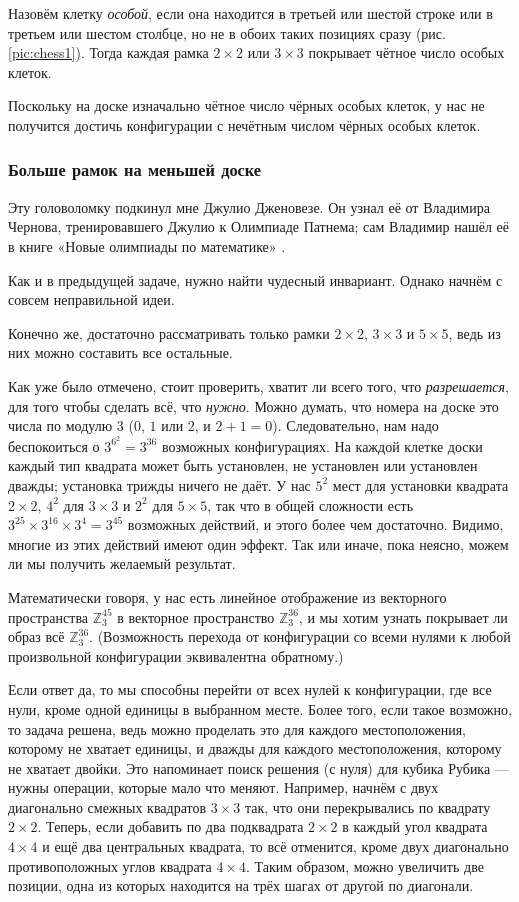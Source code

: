 Назовём клетку \emph{особой}, если она находится в третьей или шестой строке или в третьем или шестом столбце, но не в обоих таких позициях сразу (рис. \ref{pic:chess1}).
Тогда каждая рамка $2 \times 2$ или $3 \times 3$ покрывает чётное число особых клеток.

Поскольку на доске изначально чётное число чёрных особых клеток, у нас не получится достичь конфигурации с нечётным  числом чёрных особых клеток.

\subsubsection*{Больше рамок на меньшей доске}

Эту головоломку подкинул мне Джулио Дженовезе.
Он узнал её от Владимира Чернова, тренировавшего Джулио к Олимпиаде Патнема; сам Владимир нашёл её в книге «Новые олимпиады по математике» \cite{markova}.

Как и в предыдущей задаче, нужно найти чудесный инвариант.
Однако начнём с совсем неправильной идеи.

Конечно же, достаточно рассматривать только рамки $2 \times 2$, $3 \times 3$ и $5 \times 5$, ведь из них можно составить все остальные.

Как уже было отмечено, стоит проверить, хватит ли всего того, что \emph{разрешается}, для того чтобы сделать всё, что \emph{нужно}.
Можно думать, что номера на доске это числа по модулю $3$ ($0$, $1$ или $2$, и $2 + 1 = 0$).
Следовательно, нам надо беспокоиться о $3^{6^2} = 3^{36}$ возможных конфигурациях.
На каждой клетке доски каждый тип квадрата может быть установлен, не установлен или установлен дважды; установка трижды ничего не даёт.
У нас $5^2$ мест для установки квадрата $2 \times 2$,
$4^2$ для $3 \times 3$
и $2^2$ для $5 \times 5$, так что в общей сложности есть $3^{25} \times 3^{16} \times 3^4 = 3^{45}$ возможных действий, и этого более чем достаточно.
Видимо, многие из этих действий имеют один эффект.
Так или иначе, пока неясно, можем ли мы получить желаемый результат.

Математически говоря, у нас есть линейное отображение из векторного пространства $\mathbb{Z}_3^{45}$ в векторное пространство $\mathbb{Z}_3^{36}$, и мы хотим узнать покрывает ли образ всё $\mathbb{Z}_3^{36}$.
(Возможность перехода от конфигурации со всеми нулями к любой произвольной конфигурации эквивалентна обратному.)

Если ответ да, то мы способны перейти от всех нулей к конфигурации, где все нули, кроме одной единицы в выбранном месте.
Более того, если такое возможно, то задача решена, ведь можно проделать это для каждого местоположения, которому не хватает единицы, и дважды для каждого местоположения, которому не хватает двойки.
Это напоминает поиск решения (с нуля) для кубика Рубика --- нужны операции, которые мало что меняют.
Например, начнём с двух диагонально смежных квадратов $3 \times 3$ так, что они перекрывались по квадрату $2 \times 2$.
Теперь, если добавить по два подквадрата $2 \times 2$ в каждый угол квадрата $4 \times 4$ и ещё два центральных квадрата, то всё отменится, кроме двух диагонально противоположных углов квадрата $4 \times 4$.
Таким образом, можно увеличить две позиции, одна из которых находится на трёх шагах от другой по диагонали.

